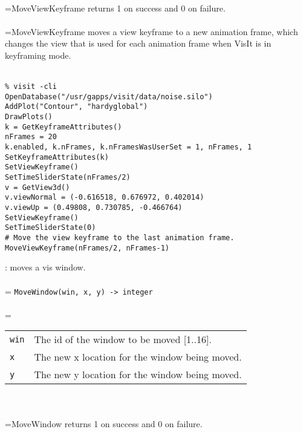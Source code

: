 \documentclass[10pt,a4paper]{report}
\begin{document}
 \\ 
\hangindent=\parindent MoveViewKeyframe returns 1 on success and 0 on failure. \\[-3mm] 

 \\ 
\hangindent=\parindent MoveViewKeyframe moves a view keyframe to a new animation frame, which changes the view that is used for each animation frame when VisIt is in keyframing mode. \\[-3mm] 

\\[-6mm]
\begin{verbatim}% visit -cli
OpenDatabase("/usr/gapps/visit/data/noise.silo")
AddPlot("Contour", "hardyglobal")
DrawPlots()
k = GetKeyframeAttributes()
nFrames = 20
k.enabled, k.nFrames, k.nFramesWasUserSet = 1, nFrames, 1
SetKeyframeAttributes(k)
SetViewKeyframe()
SetTimeSliderState(nFrames/2)
v = GetView3d()
v.viewNormal = (-0.616518, 0.676972, 0.402014)
v.viewUp = (0.49808, 0.730785, -0.466764)
SetViewKeyframe()
SetTimeSliderState(0)
# Move the view keyframe to the last animation frame.
MoveViewKeyframe(nFrames/2, nFrames-1)
\end{verbatim}
\newpage


{}
: moves a vis window.\\[-3mm]

 \\ 
\hangindent=\parindent 
\verb!MoveWindow(win, x, y) -> integer!\\ [-3mm]

 \\ 
\hangindent=\parindent 
\begin{tabular}{lp{9cm}}
\verb!win! & The id of the window to be moved [1..16]. \\
\verb!x! & The new x location for the window being moved. \\
\verb!y! & The new y location for the window being moved. \\
\end{tabular} \\[-2mm]


 \\ 
\hangindent=\parindent MoveWindow returns 1 on success and 0 on failure. \\[-3mm] 
\end{document}
